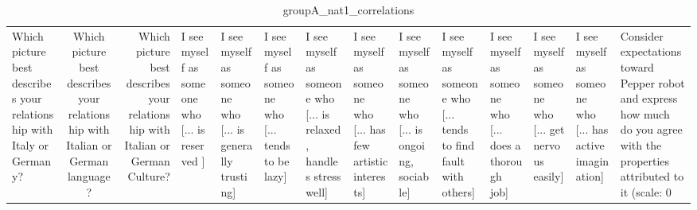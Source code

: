 \begin{table}
\caption{groupA_nat1_correlations}
\label{tab:groupA_nat1_correlations}
\begin{tabular}{lcr}
\toprule
Which picture best describes your relationship with Italy or Germany? & Which picture best describes your relationship with Italian or German language? & Which picture best describes your relationship with Italian or German Culture? & I see myself as someone who  [... is reserved ] & I see myself as someone who  [... is generally trusting] & I see myself as someone who  [... tends to be lazy] & I see myself as someone who  [... is relaxed, handles stress well] & I see myself as someone who  [... has few artistic interests] & I see myself as someone who  [... is ongoing, sociable] & I see myself as someone who  [... tends to find fault with others] & I see myself as someone who  [... does a thorough job] & I see myself as someone who  [... get nervous easily] & I see myself as someone who  [... has active imagination] & Consider expectations toward Pepper robot and express how much do you agree with the properties attributed to it (scale: 0%
\end{tabular}
\end{table}
